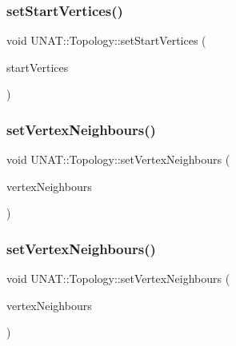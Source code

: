 \mbox{\label{classUNAT_1_1Topology_a59740da48119b1fe9cbc08ec61edd1c2}} 
\subsubsection{\texorpdfstring{setStartVertices()}{setStartVertices()}\hspace{0.1cm}{\footnotesize\ttfamily [3/3]}}
{\footnotesize\ttfamily void U\+N\+A\+T\+::\+Topology\+::set\+Start\+Vertices (\begin{DoxyParamCaption}\item[{\mbox{\hyperlink{include_2swMacro_8h_a113cf5f6b5377cdf3fac6aa4e443e9aa}{sw\+Int}} $\ast$}]{start\+Vertices }\end{DoxyParamCaption})\hspace{0.3cm}{\ttfamily [inline]}}

\mbox{\label{classUNAT_1_1Topology_aa82494c4b097ebb30f323947c9f3161e}} 
\subsubsection{\texorpdfstring{setVertexNeighbours()}{setVertexNeighbours()}\hspace{0.1cm}{\footnotesize\ttfamily [1/3]}}
{\footnotesize\ttfamily void U\+N\+A\+T\+::\+Topology\+::set\+Vertex\+Neighbours (\begin{DoxyParamCaption}\item[{\mbox{\hyperlink{include_2swMacro_8h_a113cf5f6b5377cdf3fac6aa4e443e9aa}{sw\+Int}} $\ast$}]{vertex\+Neighbours }\end{DoxyParamCaption})\hspace{0.3cm}{\ttfamily [inline]}}

\mbox{\label{classUNAT_1_1Topology_aa82494c4b097ebb30f323947c9f3161e}} 
\subsubsection{\texorpdfstring{setVertexNeighbours()}{setVertexNeighbours()}\hspace{0.1cm}{\footnotesize\ttfamily [2/3]}}
{\footnotesize\ttfamily void U\+N\+A\+T\+::\+Topology\+::set\+Vertex\+Neighbours (\begin{DoxyParamCaption}\item[{\mbox{\hyperlink{include_2swMacro_8h_a113cf5f6b5377cdf3fac6aa4e443e9aa}{sw\+Int}} $\ast$}]{vertex\+Neighbours }\end{DoxyParamCaption})\hspace{0.3cm}{\ttfamily [inline]}}

